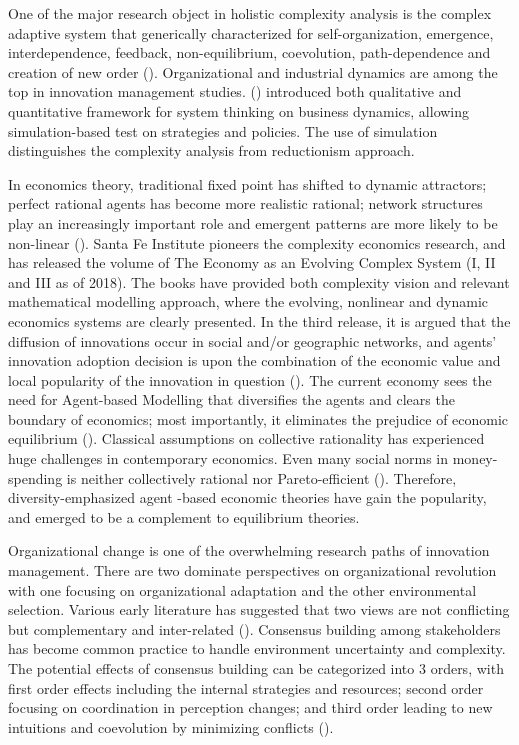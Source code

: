 \documentclass[utf8,english]{gradu3}
\begin{document}
One of the major research object in holistic complexity analysis is the complex adaptive system that generically characterized for self-organization, emergence, interdependence, feedback, non-equilibrium, coevolution, path-dependence and creation of new order (\cite{mitleton2003complex}). Organizational and industrial dynamics are among the top in innovation management studies. \citeauthor{jung2014structure} (\citeyear{jung2014structure}) introduced both qualitative and quantitative framework for system thinking on business dynamics, allowing simulation-based test on strategies and policies. The use of simulation distinguishes the complexity analysis from reductionism approach.

In economics theory, traditional fixed point has shifted to dynamic attractors; perfect rational agents has become more realistic rational; network structures play an increasingly important role and emergent patterns are more likely to be non-linear (\cite{beinhocker2006origin}). Santa Fe Institute pioneers the complexity economics research, and has released the volume of The Economy as an Evolving Complex System (I, II and III as of 2018). The books have provided both complexity vision and relevant mathematical modelling approach, where the evolving, nonlinear and dynamic economics systems are clearly presented. In the third release, it is argued that the diffusion of innovations occur in social and/or geographic networks, and agents' innovation adoption decision is upon the combination of the economic value and local popularity of the innovation in question (\cite{young2006diffusion}). The current economy sees the need for Agent-based Modelling that diversifies the agents and clears the boundary of economics; most importantly, it eliminates the prejudice of economic equilibrium (\cite{farmer2009economy}). Classical assumptions on collective rationality has experienced huge challenges in contemporary economics. Even many social norms  in money-spending is neither collectively rational nor Pareto-efficient (\cite{elster1989social}). Therefore, diversity-emphasized agent -based economic theories have gain the popularity, and emerged to be a complement to equilibrium theories. 

Organizational change is one of the overwhelming research paths of innovation management. There are two dominate perspectives on organizational revolution with one focusing on organizational adaptation and the other environmental selection. Various early literature has suggested that two views are not conflicting but complementary and inter-related (\cite{levinthal1991organizational}). Consensus building among stakeholders has become common practice to handle environment uncertainty and complexity. The potential effects of consensus building can be categorized into 3 orders, with first order effects including the internal strategies and resources; second order focusing on coordination in perception changes; and third order leading to new intuitions and coevolution by minimizing conflicts (\cite{innes1999consensus}).
\end{document}
